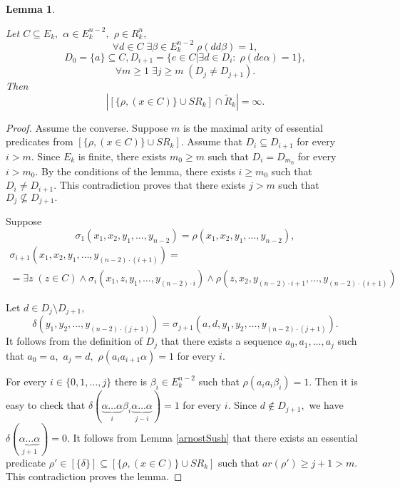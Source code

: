 \documentclass{au}
\theoremstyle{plain}
\newtheorem{lemma}{Lemma}
\theoremstyle{definition}
\theoremstyle{remark}
\numberwithin{equation}{section}
\begin{document}
\begin{lemma}\label{PosledovatelnostMnojestv}

Let
$C\subseteq E_{k},$
$\alpha \in E_{k}^{n-2},$
$\rho \in R_{k}^{n},$
$$\forall d \in C\; \exists \beta \in E_{k}^{n-2} \; \rho(d d \beta) =  1,$$
$$D_{0} = \{a\}\subseteq C,
D_{i+1} = \{e\in C | \exists d \in D_{i}:\; \rho(d e \alpha) =1 \},$$
$$\forall m\ge 1 \; \exists j\ge m \; (D_{j}\neq D_{j+1}).$$
Then $$|[\{\rho,(x\in C)\} \cup SR_{k} ]\cap \widetilde R_{k}| = \infty.$$

\end{lemma}

\begin{proof}

Assume the converse. Suppose
$m$ is the maximal arity of essential predicates from $[\{\rho,(x\in C)\} \cup SR_{k} ].$
Assume that
$D_{i}\subseteq D_{i+1}$ for every $i>m.$
Since $E_{k}$ is finite,  there exists
$m_{0}\ge m$ such that $D_{i} = D_{m_{0}}$
for every $i>m_{0}.$
By the conditions of the lemma,
there exists $i\ge m_{0}$ such that
$D_{i}\neq D_{i+1}.$
This contradiction proves that
there exists $j>m$ such that
$D_{j}\not\subseteq D_{j+1}.$

Suppose
$$\sigma_{1}(x_{1},x_{2},y_{1},\ldots, y_{n-2}) = \rho(x_{1},x_{2},y_{1},\ldots, y_{n-2}),$$
\begin{multline*}\sigma_{i+1}(x_{1},x_{2},y_{1},\ldots, y_{(n-2)\cdot (i+1)}) = \\ =
\exists z \; (z\in C)\wedge \sigma_{i}(x_{1},z,y_{1},\ldots, y_{(n-2)\cdot i})
\wedge \rho ( z,x_{2}, y_{(n-2)\cdot i+1},\ldots, y_{(n-2)\cdot (i+1)})\end{multline*}

Let $d \in D_{j}\setminus D_{j+1},$
$$\delta(y_{1},y_{2},\ldots, y_{(n-2)\cdot (j+1)}) =
\sigma_{j+1}(a,d,y_{1},y_{2},\ldots, y_{(n-2)\cdot (j+1)}).$$
It follows from the definition of $D_{j}$
that there exists a sequence
$a_{0},a_{1},\ldots,a_{j}$
such that $a_{0}= a,$ $a_{j} = d,$
$\rho(a_{i}a_{i+1}\alpha) = 1$ for every $i.$

For every $i\in \{0,1,\ldots,j\}$ there is
$\beta_{i} \in E_{k}^{n-2}$ such that
$\rho(a_{i}a_{i}\beta_{i}) = 1.$
Then it is easy to check that 
$\delta(\underbrace{\alpha \ldots \alpha}_{i} \beta_{i} \underbrace{\alpha \ldots \alpha}_{j-i}) =1$
for every $i.$
Since $d\notin D_{j+1},$ we have 
$\delta(\underbrace{\alpha \ldots \alpha}_{j+1}) = 0.$
It follows from Lemma \ref{arnostSush} that
there exists an essential predicate $\rho' \in [\{\delta\}] \subseteq [\{\rho,(x\in C)\} \cup SR_{k} ]$
such that $ar(\rho') \ge j+1>m.$
This contradiction proves the lemma.

\end{proof}
\end{document}
